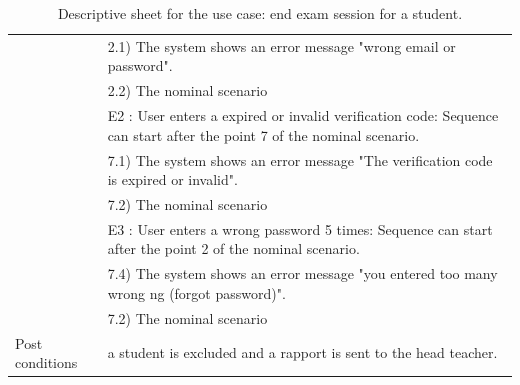 \documentclass[]{uc2pfecaneva}
\begin{document}
\begin{table}[h]
\begin{tabularx}{\textwidth}{|l|X|}
		                      & \hspace{4mm}2.1) The system shows an error message "wrong email or password".                                          \\
		                      & \hspace{4mm}2.2) The nominal scenario                                                                                  \\
		                      & E2 : User enters a expired or invalid verification code: Sequence can start after the point 7 of the nominal scenario. \\
		                      & \hspace{4mm}7.1) The system shows an error message "The verification code is expired or invalid".                      \\
		                      & \hspace{4mm}7.2) The nominal scenario                                                                                  \\
		                      & E3 : User enters a wrong password 5 times: Sequence can start after the point 2 of the nominal scenario.               \\
		                      & \hspace{4mm}7.4) The system shows an error message "you entered too many wrong ng (forgot password)".                  \\
		                      & \hspace{4mm}7.2) The nominal scenario                                                                                  \\ \hline
		Post conditions
		                      & a student is excluded and a rapport is sent to the head teacher.                                                       \\ \hline
	\end{tabularx}
	\caption{Descriptive sheet for the use case: end exam session for a student.}
	\label{table:5}
\end{table}
\clearpage
\end{document}
